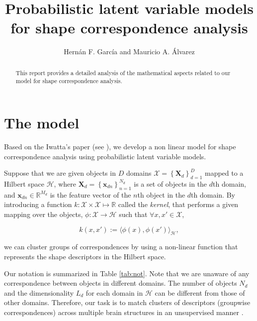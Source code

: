 \documentclass[]{article}
\title{Probabilistic latent variable models for shape correspondence analysis}
\author{Hern\'an F. Garc\'ia and Mauricio A. \'Alvarez}
\newcommand{\setObj}{\mathbf{X}_d}
\newcommand{\indobj}{\mathbf{x}_{dn}}
\newcommand{\mapphi}{\phi\left(x\right)}
\newcommand{\mapphit}{\phi\left(x'\right)}
\begin{document}
\maketitle

\begin{abstract}
This report provides a detailed analysis of the mathematical aspects related to our model for shape correspondence analysis.
\end{abstract}

\section{The model}

Based on the Iwatta's paper (see \cite{Iwata13,Iwata16}), we develop a non linear model for shape correspondence analysis using probabilistic latent variable models.

Suppose that we are given objects in $D$ domains $\mathcal{X}=\left\{\setObj\right\}_{d=1}^D$ mapped to a Hilbert space $\mathcal{H}$, where $\setObj = \left\{\indobj\right\}_{n=1}^{N_d}$ is a set of objects in the $d$th domain, and $\indobj \in \mathbb{R}^{M_d}$ is  the feature vector of the $n$th object in the $d$th domain. By introducing a function $k:\mathcal{X}\times\mathcal{X}\mapsto \mathbb{R}$ called the \textit{kernel}, that performs a given mapping over the objects, $\phi : \mathcal{X}\to\mathcal{H}$ such that $\forall x,x' \in \mathcal{X}$,

\begin{equation}
k\left(x,x'\right) := \langle\mapphi,\mapphit\rangle_{\mathcal{H}},
\end{equation}

we can cluster groups of correspondences by using a non-linear function that represents the shape descriptors in the Hilbert space.

Our notation is summarized in Table \ref{tab:not}. Note that we are unaware of any correspondence between objects in different domains. The number of objects $N_d$ and the dimensionality $L_d$ for each domain in $\mathcal{H}$ can be different from those of other domains.  Therefore, our task is to match clusters of descriptors (groupwise correspondences) across multiple brain structures in an
unsupervised manner \cite{Iwata16}.
\end{document}
